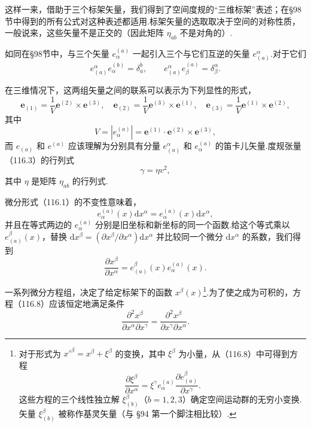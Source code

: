 这样一来，借助于三个标架矢量，我们得到了空间度规的“三维标架”表述；在§98节中得到的所有公式对这种表述都适用.标架矢量的选取取决于空间的对称性质，一般说来，这些矢量不是正交的（因此矩阵 $\eta_{ab}$ 不是对角的）.

如同在§98节中，与三个矢量 $e_{\alpha}^{(a)}$ 一起引入三个与它们互逆的矢量 $e_{(a)}^{\alpha}$.对于它们
\begin{equation}
  e_{(a)}^{\alpha}e_{\alpha}^{(b)}=\delta_{a}^{b},\qquad
  e_{(a)}^{\alpha}e_{\beta}^{(a)}=\delta_{\beta}^{\alpha}.
\end{equation}

在三维情况下，这两组矢量之间的联系可以表示为下列显性的形式，
\begin{equation}
  \boldsymbol{e}_{(1)}=\frac{1}{V}\boldsymbol{e}^{(2)}\times\boldsymbol{e}^{(3)},
  \quad
  \boldsymbol{e}_{(2)}=\frac{1}{V}\boldsymbol{e}^{(3)}\times\boldsymbol{e}^{(1)},
  \quad
  \boldsymbol{e}_{(3)}=\frac{1}{V}\boldsymbol{e}^{(1)}\times\boldsymbol{e}^{(2)},
\end{equation}
其中
\begin{equation*}
  V=|e_{\alpha}^{(a)}|
  =\boldsymbol{e}^{(1)}\cdot\boldsymbol{e}^{(2)}\times\boldsymbol{e}^{(3)},
\end{equation*}
而 $e_{(a)}$ 和 $e^{(a)}$ 应该理解为分别具有分量 $e_{(a)}^{\alpha}$ 和 $e_{\alpha}^{(a)}$ 的笛卡儿矢量.度规张量（116.3）的行列式
\begin{equation}
  \gamma=\eta v^{2},
\end{equation}
其中 $\eta$ 是矩阵 $\eta_{ab}$ 的行列式.

微分形式（116.1）的不变性意味着，
\begin{equation}
  e_{\alpha}^{(a)}(x)\mathrm{d}x^{\alpha}
  =e_{\alpha}^{(a)}(x)\mathrm{d}x^{\alpha},
\end{equation}
并且在等式两边的 $e_{\alpha}^{(a)}$ 分别是旧坐标和新坐标的同一个函数.给这个等式乘以 $e_{(a)}^{\beta}(x)$，替换 $\mathrm{d}x^{\beta}=(\partial x^{\beta}/\partial x^{\alpha})\mathrm{d}x^{\alpha}$ 并比较同一个微分 $\mathrm{d}x^{\alpha}$ 的系数，我们得到
\begin{equation}
  \frac{\partial x^{\beta}}{\partial x^{\alpha}}
  =e_{(a)}^{\beta}(x)e_{\alpha}^{(a)}(x).
\end{equation}

一系列微分方程组，决定了给定标架下的函数 $x^{\beta}(x)$\footnote{对于形式为 $x'^{\beta}=x^{\beta}+\xi^{\beta}$ 的变换，其中 $\xi^{\beta}$ 为小量，从（116.8）中可得到方程
\begin{equation}
\frac{\partial\xi^{\beta}}{\partial x^{\alpha}}
=\xi^{\gamma}e_{\alpha}^{(a)}\frac{\partial e_{(a)}^{\beta}}{\partial x^{\gamma}}.
\tag{116.8a}
\end{equation}
这些方程的三个线性独立解 $\xi_{(b)}^{\beta}$（$b=1,2,3$）确定空间运动群的无穷小变换. 矢量 $\xi_{(b)}^{\beta}$ 被称作基灵矢量（与 §94 第一个脚注相比较）.}.为了使之成为可积的，方程（116.8）应该恒定地满足条件
\begin{equation*}
  \frac{\partial^{2}x^{\beta}}{\partial x^{\alpha}\partial x^{\gamma}}
  =\frac{\partial^{2}x^{\beta}}{\partial x^{\gamma}\partial x^{\alpha}}.
\end{equation*}

